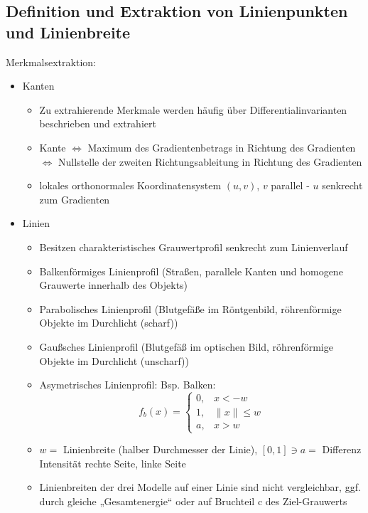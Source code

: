 \documentclass[11pt]{article}
\begin{document}
\subsection{Definition und Extraktion von Linienpunkten und Linienbreite}
    Merkmalsextraktion:
        \begin{itemize}
            \item Kanten
            \begin{itemize}
                \item Zu extrahierende Merkmale werden häufig über Differentialinvarianten beschrieben und extrahiert
                \item Kante $\Leftrightarrow$ Maximum des Gradientenbetrags in Richtung des Gradienten $\Leftrightarrow$ Nullstelle der zweiten Richtungsableitung in Richtung des Gradienten
                \item lokales orthonormales Koordinatensystem $(u, v)$, $v$ parallel - $u$ senkrecht zum Gradienten
            \end{itemize}
        \item Linien
            \begin{itemize}
                \item Besitzen charakteristisches Grauwertprofil senkrecht zum Linienverlauf
                \item Balkenförmiges Linienprofil (Straßen, parallele Kanten und homogene Grauwerte innerhalb des Objekts)
                \item Parabolisches Linienprofil (Blutgefäße im Röntgenbild, röhrenförmige Objekte im Durchlicht (scharf))
                \item Gaußsches Linienprofil (Blutgefäß im optischen Bild, röhrenförmige Objekte im Durchlicht (unscharf))
                \item Asymetrisches Linienprofil: Bsp. Balken:
                    $$f_b(x) = \begin{cases}
                        0, & x < -w \\
                        1, & \|x\| \le w \\
                        a, & x > w
                    \end{cases}$$
                \item $w =$ Linienbreite (halber Durchmesser der Linie), $[0, 1] \ni a =$ Differenz Intensität rechte Seite, linke Seite
                \item Linienbreiten der drei Modelle auf einer Linie sind nicht vergleichbar, ggf. durch gleiche „Gesamtenergie“ oder auf Bruchteil c des Ziel-Grauwerts

\end{itemize}
\end{itemize}
\end{document}
